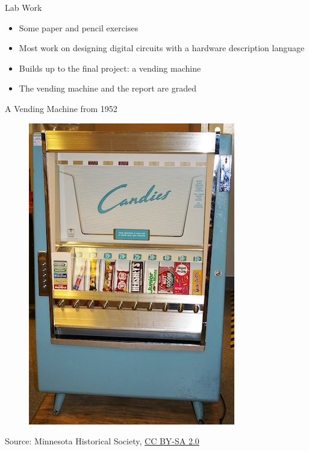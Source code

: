 \begin{frame}[fragile]{Lab Work}
\begin{itemize}
\item Some paper and pencil exercises
\item Most work on designing digital circuits with a hardware description language
\item Builds up to the final project: a vending machine
\item The vending machine and the report are graded
\end{itemize}
\end{frame}

\begin{frame}[fragile]{A Vending Machine from 1952}
\begin{figure}
    \centering
    \href{https://en.wikipedia.org/wiki/File:CandiesVendingMachine1952.jpg}{\includegraphics[scale=0.4]{CandiesVendingMachine1952}}

\end{figure}

{\tiny Source: Minnesota Historical Society, \href{https://creativecommons.org/licenses/by-sa/2.0}{CC BY-SA 2.0}}
\end{frame}

